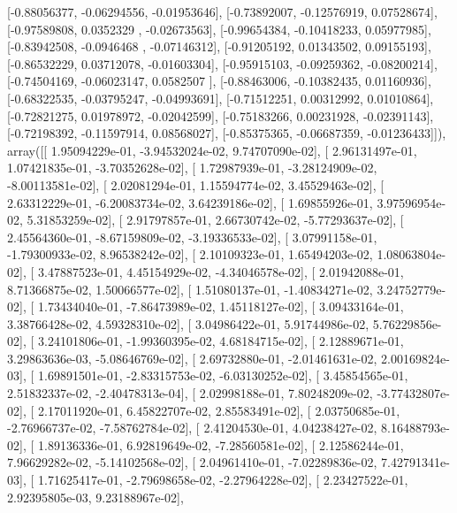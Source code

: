 \documentclass{article}
\begin{document}
       [-0.88056377, -0.06294556, -0.01953646],
       [-0.73892007, -0.12576919,  0.07528674],
       [-0.97589808,  0.0352329 , -0.02673563],
       [-0.99654384, -0.10418233,  0.05977985],
       [-0.83942508, -0.0946468 , -0.07146312],
       [-0.91205192,  0.01343502,  0.09155193],
       [-0.86532229,  0.03712078, -0.01603304],
       [-0.95915103, -0.09259362, -0.08200214],
       [-0.74504169, -0.06023147,  0.0582507 ],
       [-0.88463006, -0.10382435,  0.01160936],
       [-0.68322535, -0.03795247, -0.04993691],
       [-0.71512251,  0.00312992,  0.01010864],
       [-0.72821275,  0.01978972, -0.02042599],
       [-0.75183266,  0.00231928, -0.02391143],
       [-0.72198392, -0.11597914,  0.08568027],
       [-0.85375365, -0.06687359, -0.01236433]]), array([[  1.95094229e-01,  -3.94532024e-02,   9.74707090e-02],
       [  2.96131497e-01,   1.07421835e-01,  -3.70352628e-02],
       [  1.72987939e-01,  -3.28124909e-02,  -8.00113581e-02],
       [  2.02081294e-01,   1.15594774e-02,   3.45529463e-02],
       [  2.63312229e-01,  -6.20083734e-02,   3.64239186e-02],
       [  1.69855926e-01,   3.97596954e-02,   5.31853259e-02],
       [  2.91797857e-01,   2.66730742e-02,  -5.77293637e-02],
       [  2.45564360e-01,  -8.67159809e-02,  -3.19336533e-02],
       [  3.07991158e-01,  -1.79300933e-02,   8.96538242e-02],
       [  2.10109323e-01,   1.65494203e-02,   1.08063804e-02],
       [  3.47887523e-01,   4.45154929e-02,  -4.34046578e-02],
       [  2.01942088e-01,   8.71366875e-02,   1.50066577e-02],
       [  1.51080137e-01,  -1.40834271e-02,   3.24752779e-02],
       [  1.73434040e-01,  -7.86473989e-02,   1.45118127e-02],
       [  3.09433164e-01,   3.38766428e-02,   4.59328310e-02],
       [  3.04986422e-01,   5.91744986e-02,   5.76229856e-02],
       [  3.24101806e-01,  -1.99360395e-02,   4.68184715e-02],
       [  2.12889671e-01,   3.29863636e-03,  -5.08646769e-02],
       [  2.69732880e-01,  -2.01461631e-02,   2.00169824e-03],
       [  1.69891501e-01,  -2.83315753e-02,  -6.03130252e-02],
       [  3.45854565e-01,   2.51832337e-02,  -2.40478313e-04],
       [  2.02998188e-01,   7.80248209e-02,  -3.77432807e-02],
       [  2.17011920e-01,   6.45822707e-02,   2.85583491e-02],
       [  2.03750685e-01,  -2.76966737e-02,  -7.58762784e-02],
       [  2.41204530e-01,   4.04238427e-02,   8.16488793e-02],
       [  1.89136336e-01,   6.92819649e-02,  -7.28560581e-02],
       [  2.12586244e-01,   7.96629282e-02,  -5.14102568e-02],
       [  2.04961410e-01,  -7.02289836e-02,   7.42791341e-03],
       [  1.71625417e-01,  -2.79698658e-02,  -2.27964228e-02],
       [  2.23427522e-01,   2.92395805e-03,   9.23188967e-02],
\end{document}
